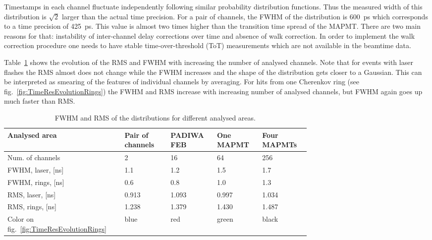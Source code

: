 \documentclass{JACoW-GSI-2015}
\begin{document}
Timestamps in each channel fluctuate independently following similar probability distribution functions. Thus the measured width of this distribution is $\sqrt 2$ larger than the actual time precision. For a pair of channels, the FWHM of the distribution is 600~ps which corresponds to a time precision of 425~ps. This value is almost two times higher than the transition time spread of the MAPMT. There are two main reasons for that: instability of inter-channel delay corrections over time and absence of walk correction. In order to implement the walk correction procedure one needs to have stable time-over-threshold (ToT) measurements which are not available in the beamtime data.



Table~\ref{tabl:EvolutionParams} shows the evolution of the RMS and FWHM with increasing the number of analysed channels. Note that for events with laser flashes the RMS almost does not change while the FWHM increases and the shape of the distribution gets closer to a Gaussian. This can be interpreted as smearing of the features of individual channels by averaging. For hits from one Cherenkov ring (see fig.~\ref{fig:TimeResEvolutionRings}) the FWHM and RMS increase with increasing number of analysed channels, but FWHM again goes up much faster than RMS.

\begin{table}[tbh]
\caption{FWHM and RMS of the distributions for different analysed areas.}
\label{tabl:EvolutionParams}
\begin{tabular}{ | p{0.22\linewidth} | p{0.13\linewidth} | p{0.12\linewidth} | p{0.12\linewidth} | p{0.12\linewidth} | }
	\hline
	\scriptsize{Analysed area} & \scriptsize{Pair of channels} & \scriptsize{PADIWA FEB} & \scriptsize{One MAPMT} & \scriptsize{Four MAPMTs} \\
	\hline
	\scriptsize{Num. of channels} & 2 & 16 & 64 & 256 \\
	\hline
	\scriptsize{FWHM, laser, [ns]} & 1.1 & 1.2 & 1.5 & 1.7 \\
	\hline
	\scriptsize{FWHM, rings, [ns]} & 0.6 & 0.8 & 1.0 & 1.3 \\
	\hline
	\scriptsize{RMS, laser, [ns]} & 0.913 & 1.093 & 0.997 & 1.034 \\
	\hline
	\scriptsize{RMS, rings, [ns]} & 1.238 & 1.379 & 1.430 & 1.487 \\
	\hline
	\scriptsize{Color on fig.~\ref{fig:TimeResEvolutionRings}} & blue & red & green & black \\
	\hline
\end{tabular}
\end{table}
\end{document}
